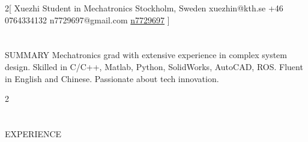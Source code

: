 \documentclass{my_cv}
\begin{document}
\begin{multicols}{2}[
        {Xuezhi}%
        {Student in Mechatronics}%
        {Stockholm, Sweden}%
        {xuezhin@kth.se}%
        {+46 0764334132}%
        {n7729697@gmail.com}%
        {\faGithub \href{https://github.com/n7729697}{n7729697}}%
]
\end{multicols}

\section{\faFileText}{SUMMARY}
Mechatronics grad with extensive experience in complex system design. Skilled in C/C++, Matlab, Python, SolidWorks, AutoCAD, ROS. Fluent in English and Chinese. Passionate about tech innovation.

\begin{multicols}{2}
\section{\faPencil}{EXPERIENCE}


\end{multicols}
\end{document}
